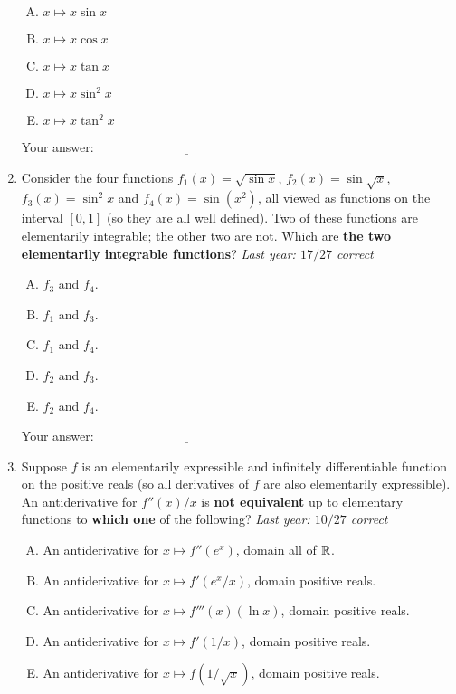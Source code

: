 \documentclass[10pt]{amsart}
\begin{document}
\begin{enumerate}
  \begin{enumerate}[(A)]
  \item $x \mapsto x \sin x$
  \item $x \mapsto x \cos x$
  \item $x \mapsto x \tan x$
  \item $x \mapsto x \sin^2x$
  \item $x \mapsto x \tan^2x$
  \end{enumerate}

  \vspace{0.1in}
  Your answer: $\underline{\qquad\qquad\qquad\qquad\qquad\qquad\qquad}$
  \vspace{0.6in}

\item Consider the four functions $f_1(x) = \sqrt{\sin x}$, $f_2(x) =
  \sin \sqrt{x}$, $f_3(x) = \sin^2 x$ and $f_4(x) = \sin(x^2)$, all
  viewed as functions on the interval $[0,1]$ (so they are all well
  defined). Two of these functions are elementarily integrable; the
  other two are not. Which are {\bf the two elementarily integrable
  functions}? {\em Last year: $17/27$ correct}

  \begin{enumerate}[(A)]
  \item $f_3$ and $f_4$.
  \item $f_1$ and $f_3$.
  \item $f_1$ and $f_4$. 
  \item $f_2$ and $f_3$.
  \item $f_2$ and $f_4$.
  \end{enumerate}

  \vspace{0.1in}
  Your answer: $\underline{\qquad\qquad\qquad\qquad\qquad\qquad\qquad}$
  \vspace{0.6in}

\item Suppose $f$ is an elementarily expressible and infinitely
  differentiable function on the positive reals (so all derivatives of
  $f$ are also elementarily expressible). An antiderivative for
  $f''(x)/x$ is {\bf not equivalent} up to elementary functions to
  {\bf which one} of the following? {\em Last year: $10/27$ correct}

  \begin{enumerate}[(A)]
  \item An antiderivative for $x \mapsto f''(e^x)$, domain all of $\mathbb{R}$.
  \item An antiderivative for $x \mapsto f'(e^x/x)$, domain positive reals.
  \item An antiderivative for $x \mapsto f'''(x)(\ln x)$, domain positive
    reals.
  \item An antiderivative for $x \mapsto f'(1/x)$, domain positive
    reals.
  \item An antiderivative for $x \mapsto f(1/\sqrt{x})$, domain positive reals.
  \end{enumerate}


\end{enumerate}
\end{document}
